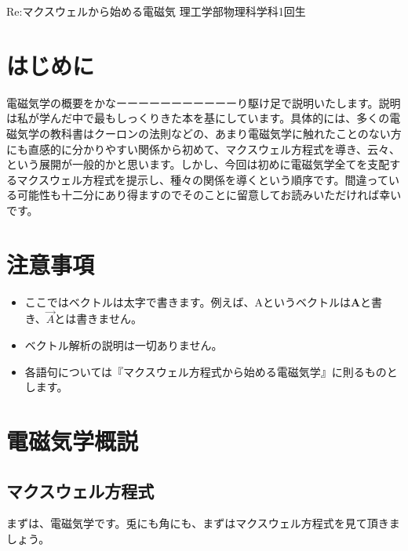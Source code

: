 \documentclass[10pt,b5paper,papersize,dvipdfmx]{jsbook}
\begin{document}


\kaishititle%
  {Re:マクスウェルから始める電磁気}%
  {理工学部物理科学科1回生}%
  {}%

\section*{はじめに}
電磁気学の概要をかなーーーーーーーーーーーり駆け足で説明いたします。説明は私が学んだ中で最もしっくりきた本を基にしています。具体的には、多くの電磁気学の教科書はクーロンの法則などの、あまり電磁気学に触れたことのない方にも直感的に分かりやすい関係から初めて、マクスウェル方程式を導き、云々、という展開が一般的かと思います。しかし、今回は初めに電磁気学全てを支配するマクスウェル方程式を提示し、種々の関係を導くという順序です。間違っている可能性も十二分にあり得ますのでそのことに留意してお読みいただければ幸いです。

\section{注意事項}
\begin{itemize}
\item ここではベクトルは太字で書きます。例えば、Aというベクトルは$\mathbf{A}$と書き、$\vec{A}$とは書きません。
\item ベクトル解析の説明は一切ありません。
\item 各語句については『マクスウェル方程式から始める電磁気学』に則るものとします。
\end{itemize}

\section{電磁気学概説}
\subsection{マクスウェル方程式}
まずは、電磁気学です。兎にも角にも、まずはマクスウェル方程式を見て頂きましょう。
\end{document}
